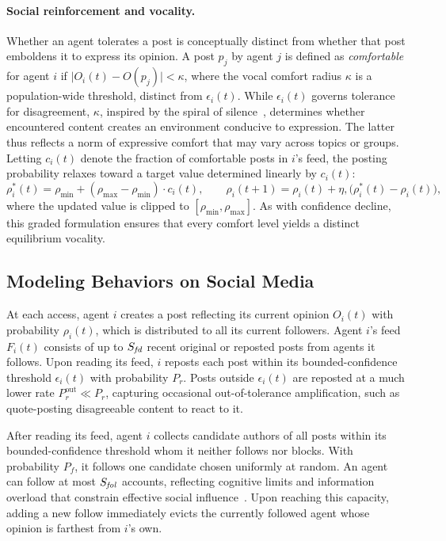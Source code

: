 \documentclass{svproc}
\def\post{\rho}                 %
\def\BoundedConfidence{\epsilon} %
\def\feed{F}                    %
\def\maxfollower{S_{\it fol}}    %
\def\maxfeed{S_{\it fd}}         %
\def\VCR{\kappa}                 %
\begin{document}
\paragraph{Social reinforcement and vocality.} 
Whether an agent tolerates a post is conceptually distinct from
whether that post emboldens it to express its opinion. A post $p_j$ by
agent $j$ is defined as \emph{comfortable} for agent $i$ if
$\vert{}O_i(t)-O(p_j)\vert{}<\VCR$, where the vocal comfort radius
$\VCR$ is a population-wide threshold, distinct from
$\BoundedConfidence_i(t)$. While $\BoundedConfidence_i(t)$ governs
tolerance for disagreement, $\VCR$, inspired by the spiral of
silence~\cite{noelle-neumann1974}, determines whether encountered
content creates an environment conducive to expression. The latter
thus reflects a norm of expressive comfort that may vary across topics
or groups. Letting $c_i(t)$ denote the fraction of comfortable posts
in $i$'s feed, the posting probability relaxes toward a target value
determined linearly by $c_i(t)$:
%
\begin{equation}\label{eq:social-reinforcement}
  \post_i^{\ast}(t) =
  \post_{\min} + (\post_{\max}-\post_{\min})\cdot c_i(t), \qquad
  \post_i(t{+}1) =
  \post_i(t) + \eta,\big(\post_i^{\ast}(t)-\post_i(t)\big),
\end{equation}
%
where the updated value is clipped to
$[\post_{\min},\post_{\max}]$. As with confidence decline, this graded
formulation ensures that every comfort level yields a distinct
equilibrium vocality.
\par


\subsection{Modeling Behaviors on Social Media}\label{sec:model-behaviors}
At each access, agent $i$ creates a post reflecting its current
opinion $O_i(t)$ with probability $\post_i(t)$, which is distributed
to all its current followers. Agent $i$'s feed $\feed_i(t)$ consists
of up to $\maxfeed$ recent original or reposted posts from agents it
follows. Upon reading its feed, $i$ reposts each post within its
bounded-confidence threshold $\BoundedConfidence_i(t)$ with
probability $P_r$. Posts outside $\BoundedConfidence_i(t)$ are
reposted at a much lower rate $P_r^{\text{out}}\ll P_r$, capturing
occasional out-of-tolerance amplification, such as quote-posting
disagreeable content to react to it.
\par


After reading its feed, agent $i$ collects candidate authors of all
posts within its bounded-confidence threshold whom it neither follows
nor blocks. With probability $P_f$, it follows one candidate chosen
uniformly at random. An agent can follow at most $\maxfollower$
accounts, reflecting cognitive limits and information overload that
constrain effective social
influence~\cite{goncalves2011,weng2012}. Upon reaching this capacity,
adding a new follow immediately evicts the currently followed agent
whose opinion is farthest from $i$'s own.
\par
\end{document}
